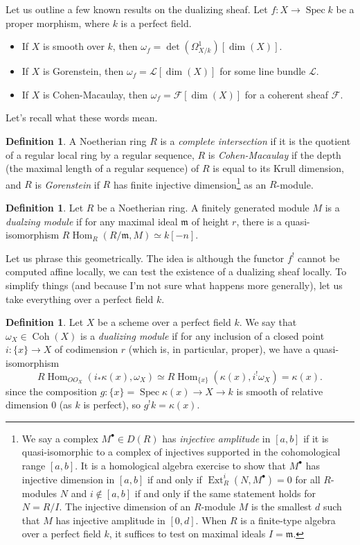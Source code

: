 \documentclass[10pt]{article}
\theoremstyle{definition}
\newtheorem{defn}[thm]{Definition}
\DeclareMathOperator{\Hom}{Hom}
\DeclareMathOperator{\Ext}{Ext}
\DeclareMathOperator{\Coh}{Coh}
\DeclareMathOperator{\Spec}{Spec}
\newcommand{\mf}{\mathfrak}
\newcommand{\LL}{\mathcal{L}}
\begin{document}
Let us outline a few known results on the dualizing sheaf.  Let $f: X \rightarrow \Spec k$ be a proper morphism, where $k$ is a perfect field.
\begin{itemize}
\item If $X$ is smooth over $k$, then $\omega_f = \det(\Omega^1_{X/k})[\dim(X)]$.
\item If $X$ is Gorenstein, then $\omega_f = \LL[\dim(X)]$ for some line bundle $\LL$.
\item If $X$ is Cohen-Macaulay, then $\omega_f = \mathcal{F}[\dim(X)]$ for a coherent sheaf $\mathcal{F}$.
\end{itemize}

Let's recall what these words mean.
\begin{defn}
A Noetherian ring $R$ is a \emph{complete intersection} if it is the quotient of a regular local ring by a regular sequence, $R$ is \emph{Cohen-Macaulay} if the depth (the maximal length of a regular sequence) of $R$ is equal to its Krull dimension, and $R$ is \emph{Gorenstein} if $R$ has finite injective dimension\footnote{We say a complex $M^\bullet \in D(R)$ has \emph{injective amplitude} in $[a, b]$ if it is quasi-isomorphic to a complex of injectives supported in the cohomological range $[a, b]$.  It is a homological algebra exercise to show that $M^\bullet$ has injective dimension in $[a, b]$ if and only if $\Ext^i_R(N, M^\bullet) = 0$ for all $R$-modules $N$ and $i \not\in [a,b]$ if and only if the same statement holds for $N = R/I$.  The injective dimension of an $R$-module $M$ is the smallest $d$ such that $M$ has injective amplitude in $[0, d]$.  When $R$ is a finite-type algebra over a perfect field $k$, it suffices to test on maximal ideals $I = \mf{m}$.} as an $R$-module.
\end{defn}


\begin{defn}
Let $R$ be a Noetherian ring.  A finitely generated module $M$ is a \emph{dualzing module} if for any maximal ideal $\mf{m}$ of height $r$, there is a quasi-isomorphism $R\Hom_R(R/\mf{m}, M) \simeq k[-n]$.
\end{defn}

Let us phrase this geometrically.  The idea is although the functor $f^!$ cannot be computed affine locally, we can test the existence of a dualizing sheaf locally.  To simplify things (and because I'm not sure what happens more generally), let us take everything over a perfect field $k$.
\begin{defn}
Let $X$ be a scheme over a perfect field $k$.  We say that $\omega_X \in \Coh(X)$ is a \emph{dualizing module} if for any inclusion of a closed point $i: \{x\} \rightarrow X$ of codimension $r$ (which is, in particular, proper), we have a quasi-isomorphism 
$$R\Hom_{OO_X}(i_* \kappa(x), \omega_X) \simeq R\Hom_{\{x\}}(\kappa(x), i^!\omega_X) = \kappa(x).$$
since the composition $g: \{x\} = \Spec \kappa(x) \rightarrow X \rightarrow k$ is smooth of relative dimension 0 (as $k$ is perfect), so $g^! k = \kappa(x)$.
\end{defn}
\end{document}
